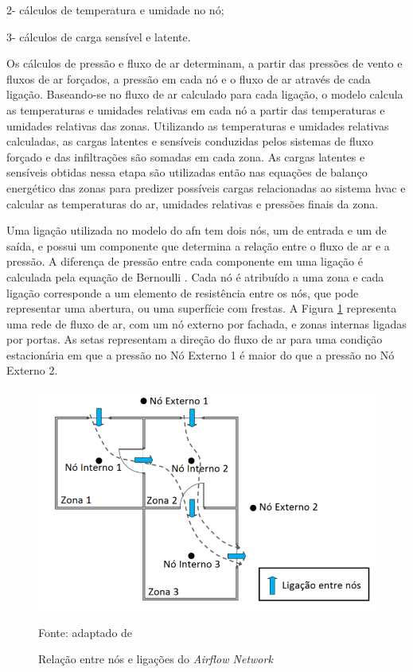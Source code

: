 \documentclass[brazil,hardcopy,openany]{ufscthesis} %
\newcommand{\source}[1]{\small \caption*{Fonte: {#1}} } %
\begin{document}
2- cálculos de temperatura e umidade no nó;

3- cálculos de carga sensível e latente.

Os cálculos de pressão e fluxo de ar determinam, a partir das pressões de vento e fluxos de ar forçados, a pressão em cada nó e o fluxo de ar através de cada ligação. Baseando-se no fluxo de ar calculado para cada ligação, o modelo	calcula as temperaturas e umidades relativas em cada nó a partir das temperaturas e umidades relativas das zonas. 
Utilizando as temperaturas e umidades relativas calculadas, as cargas latentes e sensíveis conduzidas pelos	sistemas de fluxo forçado e das infiltrações são somadas em cada zona. As cargas latentes e sensíveis obtidas nessa etapa são utilizadas então nas equações de balanço energético das zonas para predizer possíveis cargas relacionadas ao sistema \acrshort{hvac} e calcular as temperaturas do ar, umidades relativas e pressões finais da zona.

Uma ligação utilizada no modelo do \acrshort{afn} tem dois nós, um de entrada e um de saída, e possui um componente que determina a relação entre o fluxo de ar e a pressão. A diferença de pressão entre cada componente em uma ligação é calculada pela equação de Bernoulli \cite{Walton1989}. Cada nó é atribuído a uma zona e cada ligação corresponde a um elemento de resistência entre os nós, que pode representar uma abertura, ou uma superfície com frestas. A Figura \ref{fig:nos_AFN} representa uma rede de fluxo de ar, com um nó externo por fachada, e zonas internas ligadas por portas. As setas representam a direção do fluxo de ar para uma condição estacionária em que a pressão no Nó Externo 1 é maior do que a pressão no Nó Externo 2.

\begin{figure}[]
	\centering
	\caption{Relação entre nós e ligações do \textit{Airflow Network}}
	\includegraphics[width=.7\linewidth]{img/nos_AFN.png}
	\label{fig:nos_AFN}
	\source{adaptado de }
\end{figure}
\end{document}

